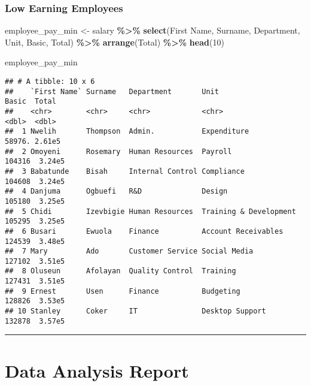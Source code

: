 \documentclass[
]{article}
\newenvironment{Shaded}{\begin{snugshade}}{\end{snugshade}}
\newcommand{\AttributeTok}[1]{\textcolor[rgb]{0.13,0.29,0.53}{#1}}
\newcommand{\DecValTok}[1]{\textcolor[rgb]{0.00,0.00,0.81}{#1}}
\newcommand{\FunctionTok}[1]{\textcolor[rgb]{0.13,0.29,0.53}{\textbf{#1}}}
\newcommand{\NormalTok}[1]{#1}
\newcommand{\OtherTok}[1]{\textcolor[rgb]{0.56,0.35,0.01}{#1}}
\newcommand{\SpecialCharTok}[1]{\textcolor[rgb]{0.81,0.36,0.00}{\textbf{#1}}}
\newcommand{\StringTok}[1]{\textcolor[rgb]{0.31,0.60,0.02}{#1}}
\begin{document}
\subsubsection{Low Earning Employees}\label{low-earning-employees}

\begin{Shaded}
\begin{Highlighting}[]
\NormalTok{employee\_pay\_min }\OtherTok{\textless{}{-}}\NormalTok{  salary }\SpecialCharTok{\%\textgreater{}\%} 
  \FunctionTok{select}\NormalTok{(}\StringTok{\textasciigrave{}}\AttributeTok{First Name}\StringTok{\textasciigrave{}}\NormalTok{,}
\NormalTok{         Surname,}
\NormalTok{         Department,}
\NormalTok{         Unit,}
\NormalTok{         Basic,}
\NormalTok{         Total) }\SpecialCharTok{\%\textgreater{}\%} 
  \FunctionTok{arrange}\NormalTok{(Total) }\SpecialCharTok{\%\textgreater{}\%} 
  \FunctionTok{head}\NormalTok{(}\DecValTok{10}\NormalTok{)}

\NormalTok{employee\_pay\_min}
\end{Highlighting}
\end{Shaded}

\begin{verbatim}
## # A tibble: 10 x 6
##    `First Name` Surname   Department       Unit                     Basic  Total
##    <chr>        <chr>     <chr>            <chr>                    <dbl>  <dbl>
##  1 Nwelih       Thompson  Admin.           Expenditure             58976. 2.61e5
##  2 Omoyeni      Rosemary  Human Resources  Payroll                104316  3.24e5
##  3 Babatunde    Bisah     Internal Control Compliance             104608  3.24e5
##  4 Danjuma      Ogbuefi   R&D              Design                 105180  3.25e5
##  5 Chidi        Izevbigie Human Resources  Training & Development 105295  3.25e5
##  6 Busari       Ewuola    Finance          Account Receivables    124539  3.48e5
##  7 Mary         Ado       Customer Service Social Media           127102  3.51e5
##  8 Oluseun      Afolayan  Quality Control  Training               127431  3.51e5
##  9 Ernest       Usen      Finance          Budgeting              128826  3.53e5
## 10 Stanley      Coker     IT               Desktop Support        132878  3.57e5
\end{verbatim}

\begin{center}\rule{0.5\linewidth}{0.5pt}\end{center}

\section{Data Analysis Report}\label{data-analysis-report}
\end{document}
